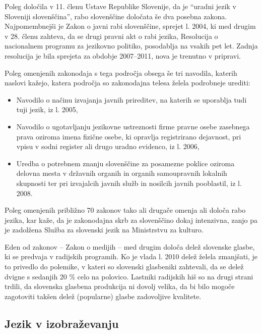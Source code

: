 \begin{multicols}{2}
Poleg določila v 11. členu Ustave Republike Slovenije, da je “uradni jezik v Sloveniji slovenščina”, rabo slovenščine določata še dva posebna zakona. Najpomembnejši je Zakon o javni rabi slovenščine, sprejet l. 2004, ki med drugim v 28. členu zahteva, da se drugi pravni akt o rabi jezika, Resolucija o nacionalnem programu za jezikovno politiko, posodablja na vsakih pet let. Zadnja resolucija je bila sprejeta za obdobje 2007--2011, nova je trenutno v pripravi. 


Poleg omenjenih zakonodaja s tega področja obsega še tri navodila, katerih naslovi kažejo, katera področja so zakonodajna telesa želela podrobneje urediti: 

\begin{itemize}
\item Navodilo o načinu izvajanja javnih prireditev, na katerih se uporablja tudi tuji jezik, iz l. 2005,
\item Navodilo o ugotavljanju jezikovne ustreznosti firme pravne osebe zasebnega prava oziroma imena fizične osebe, ki opravlja registrirano dejavnost, pri vpisu v sodni register ali drugo uradno evidenco, iz l. 2006,
\item Uredba o potrebnem znanju slovenščine za posamezne poklice oziroma delovna mesta v državnih organih in organih samou\-pravnih lokalnih skupnosti ter pri izvajalcih javnih služb in nosilcih javnih pooblastil, iz l. 2008.
\end{itemize}  

Poleg omenjenih približno 70 zakonov tako ali drugače omenja ali določa rabo jezika, kar kaže, da je zakonodajna skrb za slovenščino dokaj intenzivna, zanjo pa je zadolžena Služba za slovenski jezik na Ministrstvu za kulturo. 

Eden od zakonov – Zakon o medijih – med drugim določa delež slovenske glasbe, ki se predvaja v radijskih programih. Ko je vlada l. 2010 delež želela zmanjšati, je to privedlo do polemike, v kateri so slovenski glasbeniki zahtevali, da se delež dvigne s sedanjih 20 \% celo na polovico. Lastniki radijskih hiš so na drugi strani trdili, da slovenska glasbena produkcija ni dovolj velika, da bi bilo mogoče zagotoviti takšen delež (popularne) glasbe zadovoljive kvalitete.


\subsection{Jezik v izobraževanju}


\end{multicols}
